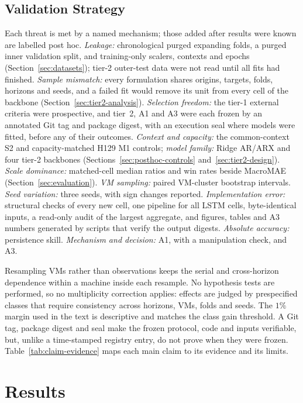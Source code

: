 \documentclass[5p,twocolumn]{elsarticle}
\begin{document}
\subsection{Validation Strategy}
\label{sec:validation-strategy}

Each threat is met by a named mechanism; those added after results were known
are labelled post hoc. \emph{Leakage:} chronological purged expanding folds, a purged inner
validation split, and training-only scalers, contexts and epochs
(Section~\ref{sec:datasets}); tier-2 outer-test data were not read until all
fits had finished. \emph{Sample mismatch:} every formulation shares origins,
targets, folds, horizons and seeds, and a failed fit would remove its unit
from every cell of the backbone (Section~\ref{sec:tier2-analysis}).
\emph{Selection freedom:} the tier-1 external criteria were prospective,
and tier~2, A1 and A3 were each frozen by an annotated Git tag and package
digest, with an execution seal where models were fitted, before any of their
outcomes. \emph{Context and capacity:} the common-context S2 and
capacity-matched H129 M1 controls; \emph{model family:} Ridge AR/ARX and four
tier-2 backbones (Sections~\ref{sec:posthoc-controls}
and~\ref{sec:tier2-design}). \emph{Scale dominance:} matched-cell median
ratios and win rates beside MacroMAE (Section~\ref{sec:evaluation}).
\emph{VM sampling:} paired VM-cluster bootstrap intervals. \emph{Seed
variation:} three seeds, with sign changes reported. \emph{Implementation
error:} structural checks of every new cell, one pipeline for all LSTM cells,
byte-identical inputs, a read-only audit of the largest aggregate, and
figures, tables and A3 numbers generated by scripts that verify the output
digests. \emph{Absolute accuracy:} persistence skill. \emph{Mechanism and
decision:} A1, with a manipulation check, and A3.

Resampling VMs rather than observations keeps the serial and cross-horizon
dependence within a machine inside each resample. No hypothesis tests are
performed, so no multiplicity correction applies: effects are judged by
prespecified classes that require consistency across horizons, VMs, folds and
seeds. The $1\%$ margin used in the text is descriptive and
matches the class gain threshold. A Git tag, package digest and seal make the
frozen protocol, code and inputs verifiable, but, unlike a time-stamped
registry entry, do not prove when they were frozen.
Table~\ref{tab:claim-evidence} maps each main claim to its evidence and its
limits.

\section{Results}
\end{document}
